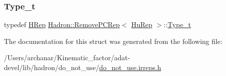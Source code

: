 \subsubsection{\texorpdfstring{Type\_t}{Type\_t}\hspace{0.1cm}{\footnotesize\ttfamily [2/2]}}
{\footnotesize\ttfamily typedef \mbox{\hyperlink{structHadron_1_1HRep}{H\+Rep}} \mbox{\hyperlink{structHadron_1_1RemovePCRep}{Hadron\+::\+Remove\+P\+C\+Rep}}$<$ \mbox{\hyperlink{structHadron_1_1HuRep}{Hu\+Rep}} $>$\+::\mbox{\hyperlink{structHadron_1_1RemovePCRep_3_01HuRep_01_4_a522cd18fd592a05606e8538a3e693d3e}{Type\+\_\+t}}}



The documentation for this struct was generated from the following file\+:\begin{DoxyCompactItemize}
\item 
/\+Users/archanar/\+Kinematic\+\_\+factor/adat-\/devel/lib/hadron/do\+\_\+not\+\_\+use/\mbox{\hyperlink{adat-devel_2lib_2hadron_2do__not__use_2do__not__use_8irreps_8h}{do\+\_\+not\+\_\+use.\+irreps.\+h}}\end{DoxyCompactItemize}
